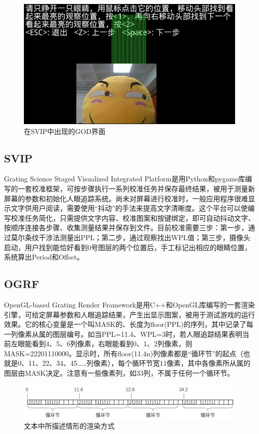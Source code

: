 \documentclass[12pt,a4paper]{article}
\begin{document}
\begin{figure}[H]
    \centering
    \includegraphics[width=0.8\linewidth]{god}
    \caption{在SVIP中出现的GOD界面}
\end{figure}



\subsection{SVIP}

Grating Science Staged Visualized Integrated Platform是用Python和pygame库编写的一套校准框架，可按步骤执行一系列校准任务并保存最终结果，被用于测量新屏幕的参数和初始化人眼追踪系统。尚未对屏幕进行校准时，一般应用程序很难显示文字供用户阅读，需要使用“抖动”的手法来提高文字清晰度。这个平台可以使编写校准任务简化，只需提供文字内容、校准图案和按键绑定，即可自动抖动文字、按顺序连接各步骤、收集测量结果并保存到文件。目前校准需要三步：第一步，通过莫尔条纹干涉法测量出PPL；第二步，通过观察找出WPL值；第三步，摄像头启动，用户找到能恰好看到0号图层的两个位置后，手工标记出相应的眼睛位置，系统算出Period和Offset。

\subsection{OGRF}

OpenGL-based Grating Render Framework是用C++和OpenGL库编写的一套渲染引擎，可给定屏幕参数和人眼追踪结果，产生出显示图案，被用于测试游戏的运行效果。它的核心变量是一个叫MASK的、长度为floor(PPL)的序列，其中记录了每一列像素从属的图层编号。如当PPL=11.4、WPL=3时，若人眼追踪结果表明当前左眼能看到4、5、6列像素，右眼能看到0、1、2列像素，则MASK=22201110000。显示时，所有floor(11.4n)列像素都是“循环节”的起点（也就是0、11、22、34、45……列像素），每个循环节宽11像素，其中各像素所从属的图层由MASK决定。注意有一些像素列，如33列，不属于任何一个循环节。

\begin{figure}[H]
    \centering
    \includegraphics[width=0.8\linewidth]{ogrf}
    \caption{文本中所描述情形的渲染方式}
\end{figure}
\end{document}
